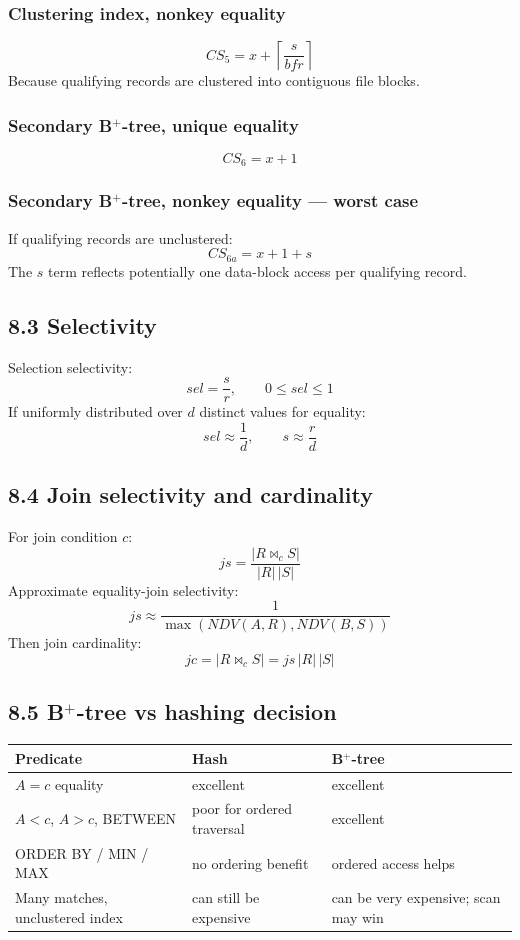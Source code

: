 \documentclass[10pt,a4paper]{article}
\begin{document}
\subsubsection*{Clustering index, nonkey equality}
\[
\boxed{CS_5=x+\left\lceil\frac{s}{bfr}\right\rceil}
\]
Because qualifying records are clustered into contiguous file blocks.

\subsubsection*{Secondary B$^+$-tree, unique equality}
\[
\boxed{CS_6=x+1}
\]

\subsubsection*{Secondary B$^+$-tree, nonkey equality --- worst case}
If qualifying records are unclustered:
\[
\boxed{CS_{6a}=x+1+s}
\]
The $s$ term reflects potentially one data-block access per qualifying record.

\subsection{8.3 Selectivity}
Selection selectivity:
\[
sel=\frac{s}{r},\qquad 0\le sel\le1
\]
If uniformly distributed over $d$ distinct values for equality:
\[
sel\approx\frac{1}{d},\qquad s\approx\frac{r}{d}
\]

\subsection{8.4 Join selectivity and cardinality}
For join condition $c$:
\[
\boxed{js=\frac{|R\bowtie_c S|}{|R|\,|S|}}
\]
Approximate equality-join selectivity:
\[
\boxed{js\approx\frac{1}{\max(NDV(A,R),NDV(B,S))}}
\]
Then join cardinality:
\[
\boxed{jc=|R\bowtie_c S|=js\,|R|\,|S|}
\]

\subsection{8.5 B$^+$-tree vs hashing decision}
\begin{center}
\begin{tabularx}{\textwidth}{p{5cm} X X}
\toprule
\textbf{Predicate} & \textbf{Hash} & \textbf{B$^+$-tree}\\
\midrule
$A=c$ equality & excellent & excellent\\
$A<c$, $A>c$, BETWEEN & poor for ordered traversal & excellent\\
ORDER BY / MIN / MAX & no ordering benefit & ordered access helps\\
Many matches, unclustered index & can still be expensive & can be very expensive; scan may win\\
\bottomrule
\end{tabularx}
\end{center}
\end{document}
